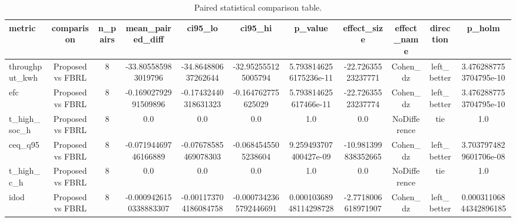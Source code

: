 \begin{table}[t]
\centering
\caption{Paired statistical comparison table.}
\label{tab:stats_auto}
\begin{tabular}{lcccccccccc}
\toprule
metric & comparison & n\_pairs & mean\_paired\_diff & ci95\_lo & ci95\_hi & p\_value & effect\_size & effect\_name & direction & p\_holm \\
\midrule
throughput\_kwh & Proposed vs FBRL & 8 & -33.805585983019796 & -34.864880637262644 & -32.952555125005794 & 5.7938146256175236e-11 & -22.72635523237771 & Cohen\_dz & left\_better & 3.4762887753704795e-10 \\
efc & Proposed vs FBRL & 8 & -0.16902792991509896 & -0.17432440318631323 & -0.164762775625029 & 5.793814625617466e-11 & -22.72635523237774 & Cohen\_dz & left\_better & 3.4762887753704795e-10 \\
t\_high\_soc\_h & Proposed vs FBRL & 8 & 0.0 & 0.0 & 0.0 & 1.0 & 0.0 & NoDifference & tie & 1.0 \\
ceq\_q95 & Proposed vs FBRL & 8 & -0.07194469746166889 & -0.07678585469078303 & -0.0684545505238604 & 9.259493707400427e-09 & -10.981399838352665 & Cohen\_dz & left\_better & 3.7037974829601706e-08 \\
t\_high\_c\_h & Proposed vs FBRL & 8 & 0.0 & 0.0 & 0.0 & 1.0 & 0.0 & NoDifference & tie & 1.0 \\
idod & Proposed vs FBRL & 8 & -0.0009426150338883307 & -0.001173704186084758 & -0.0007342365792446691 & 0.00010368948114298728 & -2.7718006618971907 & Cohen\_dz & left\_better & 0.00031106844342896185 \\
\bottomrule
\end{tabular}
\end{table}